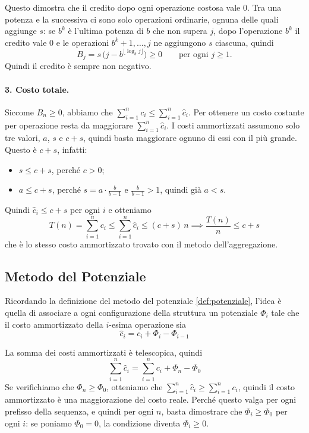 Questo dimostra che il credito dopo ogni operazione costosa vale $0$. Tra una potenza e la successiva ci sono solo operazioni ordinarie, ognuna delle quali aggiunge $s$: se $b^k$ è l'ultima potenza di $b$ che non supera $j$, dopo l'operazione $b^k$ il credito vale $0$ e le operazioni $b^k+1, \dots, j$ ne aggiungono $s$ ciascuna, quindi
\[
B_j = s\,\big(j - b^{\lfloor \log_b j \rfloor}\big) \ge 0 \qquad \text{per ogni } j \ge 1.
\]
Quindi il credito è sempre non negativo.

\paragraph{3. Costo totale.}
Siccome $B_n \ge 0$, abbiamo che $\sum_{i=1}^n c_i \le \sum_{i=1}^n \hat{c}_i$.
Per ottenere un costo costante per operazione resta da maggiorare
$\sum_{i=1}^n \hat{c}_i$. I costi ammortizzati assumono solo tre valori,
$a$, $s$ e $c+s$, quindi basta maggiorare ognuno di essi con il più grande.
Questo è $c+s$, infatti:
\begin{itemize}
    \item $s \le c + s$, perché $c > 0$;
    \item $a \le c + s$, perché $s = a \cdot \frac{b}{b-1}$ e $\frac{b}{b-1} > 1$, quindi già $a < s$.
\end{itemize}
Quindi $\hat{c}_i \le c + s$ per ogni $i$ e otteniamo
\begin{equation}
    T(n) = \sum_{i=1}^n c_i \le \sum_{i=1}^n \hat{c}_i \le (c+s)\,n
    \implies \frac{T(n)}{n} \le c + s
\end{equation}
che è lo stesso costo ammortizzato trovato con il metodo dell'aggregazione.

\subsection{Metodo del Potenziale}\label{sec:appendice_esercizi_analisi_ammortizzata_potenziale}
Ricordando la definizione del metodo del potenziale \ref{def:potenziale}, l'idea è quella di associare a ogni configurazione della struttura un potenziale $\Phi_i$ tale che il costo ammortizzato della $i$-esima operazione sia
\[
    \hat{c}_i = c_i + \Phi_i - \Phi_{i-1}
\]

La somma dei costi ammortizzati è telescopica, quindi
\[
\sum_{i=1}^n \hat{c}_i = \sum_{i=1}^n c_i + \Phi_n - \Phi_0
\]
Se verifichiamo che $\Phi_n \ge \Phi_0$, otteniamo che $\sum_{i=1}^n \hat{c}_i \ge \sum_{i=1}^n c_i$, quindi il costo ammortizzato è una maggiorazione del costo reale. Perché questo valga per ogni prefisso della sequenza, e quindi per ogni $n$, basta dimostrare che $\Phi_i \ge \Phi_0$ per ogni $i$: se poniamo $\Phi_0 = 0$, la condizione diventa $\Phi_i \ge 0$.

